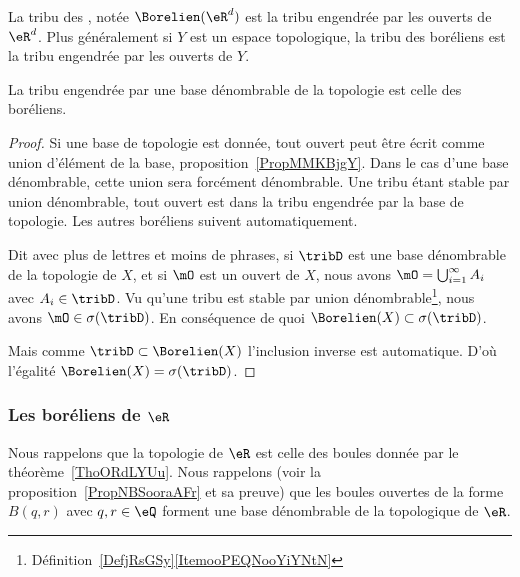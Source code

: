 \begin{definition}        \label{DEFooQBQGooTqGdtY}
    La tribu des , notée \( \Borelien(\eR^d)\) est la tribu engendrée par les ouverts de \( \eR^d\). Plus généralement si \( Y\) est un espace topologique, la tribu des boréliens est la tribu engendrée par les ouverts de \( Y\).
\end{definition}

\begin{proposition} \label{PROPooYEkvbWBz}
    La tribu engendrée par une base dénombrable de la topologie est celle des boréliens.
\end{proposition}

\begin{proof}
    Si une base de topologie est donnée, tout ouvert peut être écrit comme union d'élément de la base, proposition~\ref{PropMMKBjgY}. Dans le cas d'une base dénombrable, cette union sera forcément dénombrable. Une tribu étant stable par union dénombrable, tout ouvert est dans la tribu engendrée par la base de topologie. Les autres boréliens suivent automatiquement.

    Dit avec plus de lettres et moins de phrases, si \( \tribD\) est une base dénombrable de la topologie de \( X\), et si \( \mO\) est un ouvert de \( X\), nous avons \( \mO=\bigcup_{i=1}^{\infty}A_i\) avec \( A_i\in\tribD\). Vu qu'une tribu est stable par union dénombrable\footnote{Définition~\ref{DefjRsGSy}\ref{ItemooPEQNooYiYNtN}}, nous avons \( \mO\in\sigma(\tribD)\). En conséquence de quoi \( \Borelien(X)\subset\sigma(\tribD)\).

    Mais comme \( \tribD\subset\Borelien(X)\) l'inclusion inverse est automatique. D'où l'égalité \( \Borelien(X)=\sigma(\tribD)\).
\end{proof}

\subsubsection{Les boréliens de \texorpdfstring{$ \eR$}{R}}

Nous rappelons que la topologie de \( \eR\) est celle des boules donnée par le théorème~\ref{ThoORdLYUu}. Nous rappelons (voir la proposition~\ref{PropNBSooraAFr} et sa preuve) que les boules ouvertes de la forme \( B(q,r)\) avec \( q,r\in \eQ\) forment une base dénombrable de la topologique de \( \eR\).

